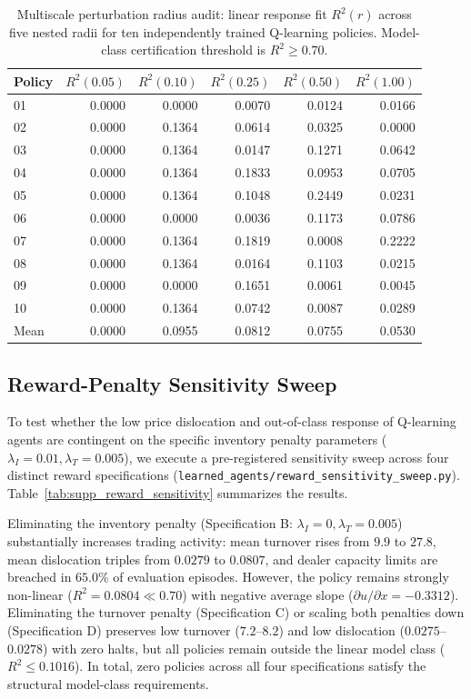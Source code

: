 \documentclass[11pt,a4paper]{article}
\theoremstyle{definition}\newtheorem{definition}[theorem]{Definition}
\theoremstyle{remark}\newtheorem{remark}[theorem]{Remark}
\begin{document}
\begin{table}[htbp]
\centering\small
\caption{Multiscale perturbation radius audit: linear response fit $R^2(r)$ across five nested radii for ten independently trained Q-learning policies. Model-class certification threshold is $R^2 \ge 0.70$.}
\label{tab:supp_multiscale_audit}
\begin{tabular}{lrrrrr}
\toprule
Policy & $R^2(0.05)$ & $R^2(0.10)$ & $R^2(0.25)$ & $R^2(0.50)$ & $R^2(1.00)$ \\
\midrule
01 & 0.0000 & 0.0000 & 0.0070 & 0.0124 & 0.0166 \\
02 & 0.0000 & 0.1364 & 0.0614 & 0.0325 & 0.0000 \\
03 & 0.0000 & 0.1364 & 0.0147 & 0.1271 & 0.0642 \\
04 & 0.0000 & 0.1364 & 0.1833 & 0.0953 & 0.0705 \\
05 & 0.0000 & 0.1364 & 0.1048 & 0.2449 & 0.0231 \\
06 & 0.0000 & 0.0000 & 0.0036 & 0.1173 & 0.0786 \\
07 & 0.0000 & 0.1364 & 0.1819 & 0.0008 & 0.2222 \\
08 & 0.0000 & 0.1364 & 0.0164 & 0.1103 & 0.0215 \\
09 & 0.0000 & 0.0000 & 0.1651 & 0.0061 & 0.0045 \\
10 & 0.0000 & 0.1364 & 0.0742 & 0.0087 & 0.0289 \\
\midrule
Mean & 0.0000 & 0.0955 & 0.0812 & 0.0755 & 0.0530 \\
\bottomrule
\end{tabular}
\end{table}

\subsection{Reward-Penalty Sensitivity Sweep}
\label{sec:supp_reward_sensitivity}
To test whether the low price dislocation and out-of-class response of Q-learning agents are contingent on the specific inventory penalty parameters ($\lambda_I = 0.01, \lambda_T = 0.005$), we execute a pre-registered sensitivity sweep across four distinct reward specifications (\nolinkurl{learned_agents/reward_sensitivity_sweep.py}). Table~\ref{tab:supp_reward_sensitivity} summarizes the results.

Eliminating the inventory penalty (Specification B: $\lambda_I = 0, \lambda_T = 0.005$) substantially increases trading activity: mean turnover rises from $9.9$ to $27.8$, mean dislocation triples from $0.0279$ to $0.0807$, and dealer capacity limits are breached in $65.0\%$ of evaluation episodes. However, the policy remains strongly non-linear ($R^2 = 0.0804 \ll 0.70$) with negative average slope ($\partial u/\partial x = -0.3312$). Eliminating the turnover penalty (Specification C) or scaling both penalties down (Specification D) preserves low turnover ($7.2$--$8.2$) and low dislocation ($0.0275$--$0.0278$) with zero halts, but all policies remain outside the linear model class ($R^2 \le 0.1016$). In total, zero policies across all four specifications satisfy the structural model-class requirements.
\end{document}
